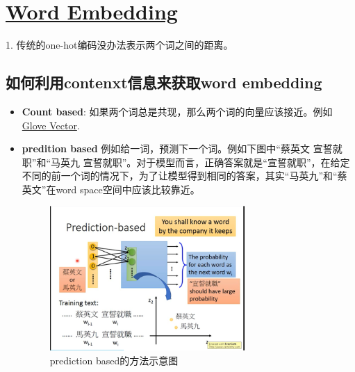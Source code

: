 \documentclass{article}
\begin{document}
\section{\href{https://www.bilibili.com/video/BV1JE411g7XF?p=23}{Word Embedding}}
1. 传统的one-hot编码没办法表示两个词之间的距离。
\subsection{如何利用contenxt信息来获取word embedding}
\begin{itemize}
    \item \textbf{Count based}: 如果两个词总是共现，那么两个词的向量应该接近。例如\href{http://nlp.stanford.edu/projects/glove/}{Glove Vector}.
    \item \textbf{predition based} 例如给一词，预测下一个词。例如下图中“蔡英文 宣誓就职”和“马英九 宣誓就职”。对于模型而言，正确答案就是“宣誓就职”，在给定不同的前一个词的情况下，为了让模型得到相同的答案，其实“马英九”和“蔡英文”在word space空间中应该比较靠近。
    \begin{figure}[H] %
        \centering %
        \includegraphics[width=0.7\textwidth]{fig/prediction_based.png} %
        \caption{prediction based的方法示意图} %
        \label{prediction_based} %
    \end{figure}


\end{itemize}
\end{document}
